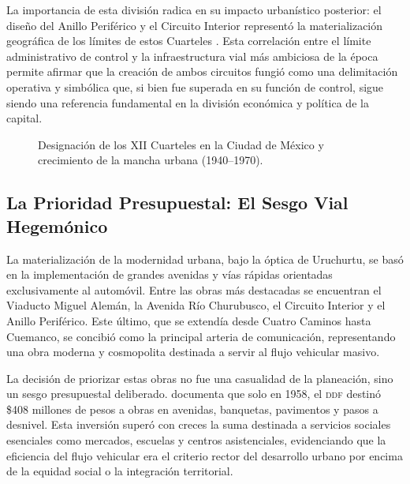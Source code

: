La importancia de esta división radica en su impacto urbanístico posterior: el diseño
del Anillo Periférico y el Circuito Interior representó la materialización geográfica
de los límites de estos Cuarteles \parencite[Tomo~1, p.~257]{perlo2023}. Esta
correlación entre el límite administrativo de control y la infraestructura vial más
ambiciosa de la época permite afirmar que la creación de ambos circuitos fungió como
una delimitación operativa y simbólica que, si bien fue superada en su función de
control, sigue siendo una referencia fundamental en la división económica y política
de la capital.

\begin{figure}[H]
    \centering
    \caption[Designación de los XII Cuarteles en la Ciudad de México]{Designación
    de los XII Cuarteles en la Ciudad de México y crecimiento de la mancha urbana
    (1940--1970).}
    \label{fig:xii-cuarteles}
\end{figure}

\subsection{La Prioridad Presupuestal: El Sesgo Vial Hegemónico}
\label{subsec:sesgo-vial}

La materialización de la modernidad urbana, bajo la óptica de Uruchurtu, se basó en
la implementación de grandes avenidas y vías rápidas orientadas exclusivamente al
automóvil. Entre las obras más destacadas se encuentran el Viaducto Miguel Alemán,
la Avenida Río Churubusco, el Circuito Interior y el Anillo Periférico. Este último,
que se extendía desde Cuatro Caminos hasta Cuemanco, se concibió como la
principal arteria de comunicación, representando una obra moderna y cosmopolita
destinada a servir al flujo vehicular masivo.

La decisión de priorizar estas obras no fue una casualidad de la planeación, sino un
sesgo presupuestal deliberado. \textcite[Tomo~1, p.~391]{perlo2023} documenta que
solo en 1958, el \textsc{ddf} destinó \$408 millones de pesos a obras en avenidas,
banquetas, pavimentos y pasos a desnivel. Esta inversión superó con creces la suma
destinada a servicios sociales esenciales como mercados, escuelas y centros
asistenciales, evidenciando que la eficiencia del flujo vehicular era el criterio rector
del desarrollo urbano por encima de la equidad social o la integración territorial.

